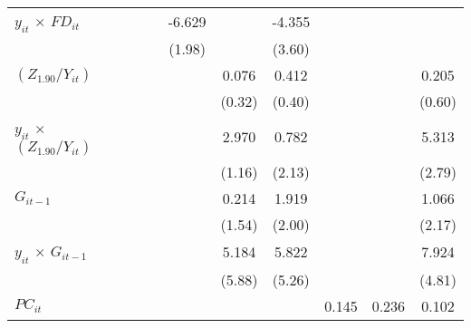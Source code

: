 \documentclass[12pt, a4paper]{article}
\begin{document}
\begin{table}
\begin{threeparttable}
{\begin{tabular}{l*{9}{c}}
				$y_{it}$ $\times$ $FD_{it}$ &                     &                     &                     &      -6.629\sym{**} &                     &      -4.355         &                     &                     &                     \\
				&                     &                     &                     &      (1.98)         &                     &      (3.60)         &                     &                     &                     \\
				$(Z_{1.90}/Y_{it})$          &                     &                     &                     &                     &       0.076         &       0.412         &                     &                     &       0.205         \\
				&                     &                     &                     &                     &      (0.32)         &      (0.40)         &                     &                     &      (0.60)         \\
				$y_{it}$ $\times$ $(Z_{1.90}/Y_{it})$&                     &                     &                     &                     &       2.970\sym{*}  &       0.782         &                     &                     &       5.313         \\
				&                     &                     &                     &                     &      (1.16)         &      (2.13)         &                     &                     &      (2.79)         \\
				$G_{it-1}$            &                     &                     &                     &                     &       0.214         &       1.919         &                     &                     &       1.066         \\
				&                     &                     &                     &                     &      (1.54)         &      (2.00)         &                     &                     &      (2.17)         \\
				$y_{it}$ $\times$ $G_{it-1}$&                     &                     &                     &                     &       5.184         &       5.822         &                     &                     &       7.924         \\
				&                     &                     &                     &                     &      (5.88)         &      (5.26)         &                     &                     &      (4.81)         \\
				$PC_{it}$                 &                     &                     &                     &                     &                     &                     &       0.145         &       0.236         &       0.102         \\

\end{tabular}}
\end{threeparttable}
\end{table}
\end{document}
